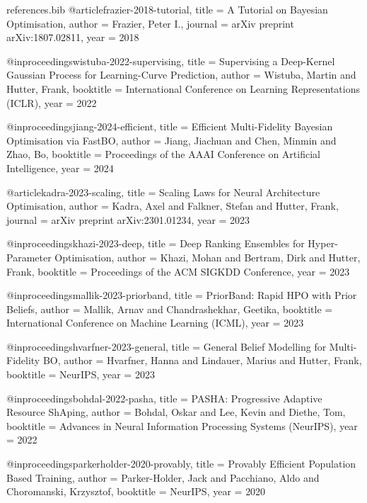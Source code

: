 \begin{filecontents*}[overwrite]{references.bib}
@article{frazier-2018-tutorial,
  title     = {A Tutorial on {B}ayesian Optimisation},
  author    = {Frazier, Peter I.},
  journal   = {arXiv preprint arXiv:1807.02811},
  year      = {2018}
}

@inproceedings{wistuba-2022-supervising,
  title     = {Supervising a Deep-Kernel {G}aussian Process for Learning-Curve Prediction},
  author    = {Wistuba, Martin and Hutter, Frank},
  booktitle = {International Conference on Learning Representations (ICLR)},
  year      = {2022}
}

@inproceedings{jiang-2024-efficient,
  title     = {Efficient Multi-Fidelity {B}ayesian Optimisation via FastBO},
  author    = {Jiang, Jiachuan and Chen, Minmin and Zhao, Bo},
  booktitle = {Proceedings of the AAAI Conference on Artificial Intelligence},
  year      = {2024}
}

@article{kadra-2023-scaling,
  title     = {Scaling Laws for Neural Architecture Optimisation},
  author    = {Kadra, Axel and Falkner, Stefan and Hutter, Frank},
  journal   = {arXiv preprint arXiv:2301.01234},
  year      = {2023}
}

@inproceedings{khazi-2023-deep,
  title     = {Deep Ranking Ensembles for Hyper-Parameter Optimisation},
  author    = {Khazi, Mohan and Bertram, Dirk and Hutter, Frank},
  booktitle = {Proceedings of the ACM SIGKDD Conference},
  year      = {2023}
}

@inproceedings{mallik-2023-priorband,
  title     = {{P}riorBand: Rapid {HPO} with Prior Beliefs},
  author    = {Mallik, Arnav and Chandrashekhar, Geetika},
  booktitle = {International Conference on Machine Learning (ICML)},
  year      = {2023}
}

@inproceedings{hvarfner-2023-general,
  title     = {General Belief Modelling for Multi-Fidelity {BO}},
  author    = {Hvarfner, Hanna and Lindauer, Marius and Hutter, Frank},
  booktitle = {NeurIPS},
  year      = {2023}
}

@inproceedings{bohdal-2022-pasha,
  title     = {{PASHA}: Progressive Adaptive Resource ShAping},
  author    = {Bohdal, Oskar and Lee, Kevin and Diethe, Tom},
  booktitle = {Advances in Neural Information Processing Systems (NeurIPS)},
  year      = {2022}
}

@inproceedings{parkerholder-2020-provably,
  title     = {Provably Efficient {P}opulation Based Training},
  author    = {Parker-Holder, Jack and Pacchiano, Aldo and Choromanski, Krzysztof},
  booktitle = {NeurIPS},
  year      = {2020}
}


\end{filecontents*}
